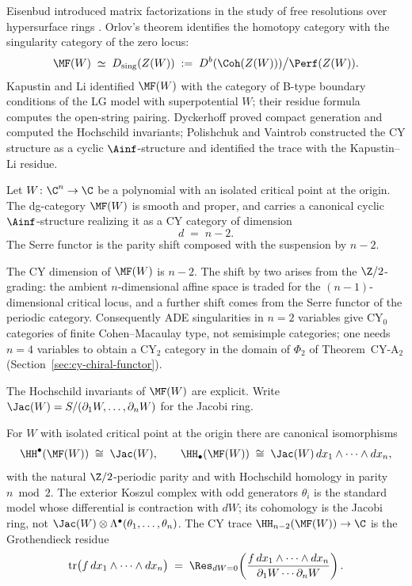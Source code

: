 Eisenbud introduced matrix factorizations in the study of free resolutions over hypersurface rings \cite{Eisenbud1980}. Orlov's theorem \cite{Orlov2004} identifies the homotopy category with the singularity category of the zero locus:
\[
 \MF(W) \;\simeq\; D_{\mathrm{sing}}(Z(W)) \;:=\; D^b(\Coh(Z(W)))\big/\Perf(Z(W)).
\]
Kapustin and Li \cite{KapustinLi2003} identified $\MF(W)$ with the category of B-type boundary conditions of the LG model with superpotential $W$; their residue formula computes the open-string pairing. Dyckerhoff \cite{Dyckerhoff2011} proved compact generation and computed the Hochschild invariants; Polishchuk and Vaintrob \cite{PolishchukVaintrob2012} constructed the CY structure as a cyclic $\Ainf$-structure and identified the trace with the Kapustin--Li residue.

\begin{theorem}
\label{thm:mf-cy-dimension}
Let $W \colon \C^n \to \C$ be a polynomial with an isolated critical point at the origin. The dg-category $\MF(W)$ is smooth and proper, and carries a canonical cyclic $\Ainf$-structure realizing it as a CY category of dimension
\[
 d \;=\; n - 2.
\]
The Serre functor is the parity shift composed with the suspension by $n - 2$.
\end{theorem}

\begin{remark}
\label{rem:mf-dim-caveat}
The CY dimension of $\MF(W)$ is $n - 2$. The shift by two arises from the $\Z/2$-grading: the ambient $n$-dimensional affine space is traded for the $(n-1)$-dimensional critical locus, and a further shift comes from the Serre functor of the periodic category. Consequently ADE singularities in $n = 2$ variables give CY$_0$ categories of finite Cohen--Macaulay type, not semisimple categories; one needs $n = 4$ variables to obtain a CY$_2$ category in the domain of $\Phi_2$ of Theorem~CY-A$_2$ (Section~\ref{sec:cy-chiral-functor}).
\end{remark}

The Hochschild invariants of $\MF(W)$ are explicit. Write $\Jac(W) = S/(\partial_1 W, \ldots, \partial_n W)$ for the Jacobi ring.

\begin{theorem}
\label{thm:mf-hh}
For $W$ with isolated critical point at the origin there are canonical isomorphisms
\[
 \HH^{\bullet}(\MF(W)) \;\cong\; \Jac(W),
 \qquad
 \HH_{\bullet}(\MF(W)) \;\cong\; \Jac(W)\, dx_1 \wedge \cdots \wedge dx_n,
\]
with the natural $\Z/2$-periodic parity and with Hochschild homology in parity $n \bmod 2$. The exterior Koszul complex with odd generators $\theta_i$ is the standard model whose differential is contraction with $dW$; its cohomology is the Jacobi ring, not $\Jac(W)\otimes\Lambda^\bullet(\theta_1,\ldots,\theta_n)$. The CY trace $\HH_{n-2}(\MF(W)) \to \C$ is the Grothendieck residue
\[
 \mathrm{tr}\bigl(f\, dx_1 \wedge \cdots \wedge dx_n\bigr)
 \;=\;
 \Res_{dW = 0}\!\left( \frac{f\, dx_1 \wedge \cdots \wedge dx_n}{\partial_1 W \cdots \partial_n W} \right) .
\]
\end{theorem}

